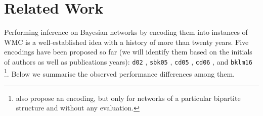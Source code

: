 \section{Related Work}\label{sec:related}

Performing inference on Bayesian networks by encoding them into instances of WMC
is a well-established idea with a history of more than twenty years. Five
encodings have been proposed so far (we will identify them based on the initials
of authors as well as publications years): \texttt{d02}
\citep{DBLP:conf/kr/Darwiche02}, \texttt{sbk05} \citep{DBLP:conf/aaai/SangBK05},
\texttt{cd05} \citep{DBLP:conf/ijcai/ChaviraD05}, \texttt{cd06}
\citep{DBLP:conf/sat/ChaviraD06}, and \texttt{bklm16}
\citep{DBLP:conf/ecai/BartKLM16}\footnote{\citet{DBLP:conf/scai/VomlelT13} also
  propose an encoding, but only for networks of a particular bipartite structure
  and without any evaluation.}. Below we summarise the observed performance
differences among them.

